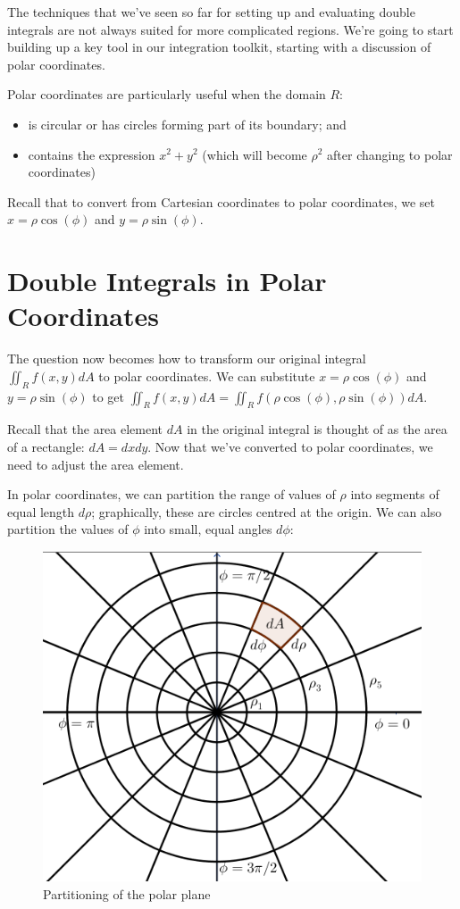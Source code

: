 \documentclass[
]{book}
\providecommand{\tightlist}{%
  \setlength{\itemsep}{0pt}\setlength{\parskip}{0pt}}
\theoremstyle{definition}
\theoremstyle{definition}
\theoremstyle{definition}
\theoremstyle{definition}
\theoremstyle{remark}
\begin{document}
The techniques that we've seen so far for setting up and evaluating double integrals are not always suited for more complicated regions. We're going to start building up a key tool in our integration toolkit, starting with a discussion of polar coordinates.

Polar coordinates are particularly useful when the domain \(R\):

\begin{itemize}
\tightlist
\item
  is circular or has circles forming part of its boundary; and
\item
  contains the expression \(x^2+y^2\) (which will become \(\rho^2\) after changing to polar coordinates)
\end{itemize}

Recall that to convert from Cartesian coordinates to polar coordinates, we set \(x= \rho \cos(\phi)\) and \(y=\rho\sin(\phi)\).

\hypertarget{double-integrals-in-polar-coordinates}{%
\section{Double Integrals in Polar Coordinates}\label{double-integrals-in-polar-coordinates}}

The question now becomes how to transform our original integral \(\displaystyle \iint_R f(x,y)dA\) to polar coordinates. We can substitute \(x= \rho \cos(\phi)\) and \(y=\rho\sin(\phi)\) to get \(\displaystyle \iint_R f(x,y)dA = \iint_R f(\rho\cos(\phi), \rho\sin(\phi))dA\).

Recall that the area element \(dA\) in the original integral is thought of as the area of a rectangle: \(dA=dxdy\). Now that we've converted to polar coordinates, we need to adjust the area element.

In polar coordinates, we can partition the range of values of \(\rho\) into segments of equal length \(d\rho\); graphically, these are circles centred at the origin. We can also partition the values of \(\phi\) into small, equal angles \(d\phi\):

\begin{figure}

{\centering \includegraphics[width=0.5\linewidth]{images/lec-12-polar} 

}

\caption{Partitioning of the polar plane}\label{fig:unnamed-chunk-25}
\end{figure}
\end{document}
